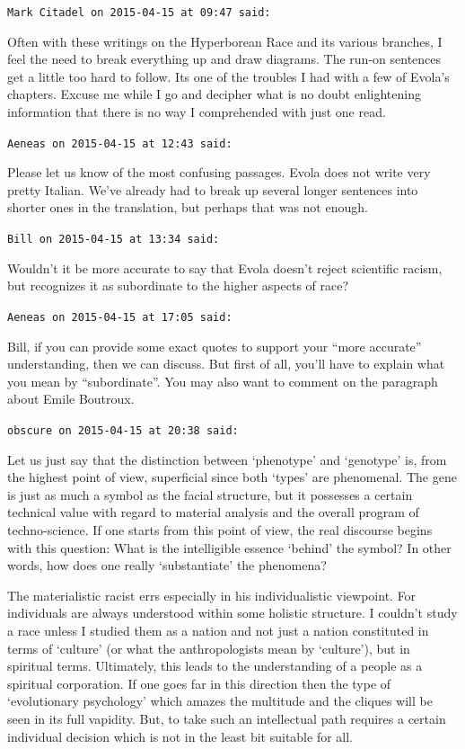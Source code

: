 \begin{footnotesize}
\begin{sffamily}
\texttt{Mark Citadel on 2015-04-15 at 09:47 said:}

Often with these writings on the Hyperborean Race and its various branches, I feel the need to break everything up and draw diagrams. The run-on sentences get a little too hard to follow. Its one of the troubles I had with a few of Evola's chapters. Excuse me while I go and decipher what is no doubt enlightening information that there is no way I comprehended with just one read.

\hfill

\texttt{Aeneas on 2015-04-15 at 12:43 said:}

Please let us know of the most confusing passages. Evola does not write very pretty Italian. We've already had to break up several longer sentences into shorter ones in the translation, but perhaps that was not enough.

\hfill

\texttt{Bill on 2015-04-15 at 13:34 said:}

Wouldn't it be more accurate to say that Evola doesn't reject scientific racism, but recognizes it as subordinate to the higher aspects of race?

\hfill

\texttt{Aeneas on 2015-04-15 at 17:05 said:}

Bill, if you can provide some exact quotes to support your ``more accurate'' understanding, then we can discuss. But first of all, you'll have to explain what you mean by ``subordinate''. You may also want to comment on the paragraph about Emile Boutroux.

\hfill

\texttt{obscure on 2015-04-15 at 20:38 said:}

Let us just say that the distinction between `phenotype' and `genotype' is, from the highest point of view, superficial since both `types' are phenomenal. The gene is just as much a symbol as the facial structure, but it possesses a certain technical value with regard to material analysis and the overall program of techno-science. If one starts from this point of view, the real discourse begins with this question: What is the intelligible essence `behind' the symbol? In other words, how does one really `substantiate' the phenomena?

The materialistic racist errs especially in his individualistic viewpoint. For individuals are always understood within some holistic structure. I couldn't study a race unless I studied them as a nation and not just a nation constituted in terms of `culture' (or what the anthropologists mean by `culture'), but in spiritual terms. Ultimately, this leads to the understanding of a people as a spiritual corporation. If one goes far in this direction then the type of `evolutionary psychology' which amazes the multitude and the cliques will be seen in its full vapidity. But, to take such an intellectual path requires a certain individual decision which is not in the least bit suitable for all.


\end{sffamily}
\end{footnotesize}
